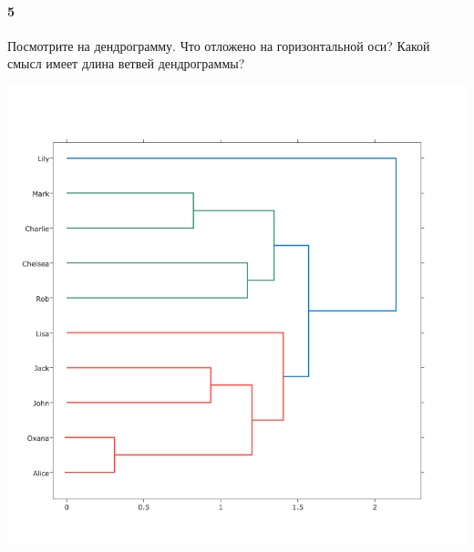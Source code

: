 \documentclass[a4paper,12pt]{article}
\begin{document}
  \paragraph{5} 
  \begin{minipage}{0.45\linewidth}
    Посмотрите на дендрограмму. Что отложено на горизонтальной оси? Какой смысл имеет длина ветвей дендрограммы? \\     
  \end{minipage}%
  \begin{minipage}{0.45\linewidth}
    \begin{center}
      \includegraphics[width=\linewidth]{images/newplot}\\
    \end{center}
  \end{minipage}\\
  \makebox[\linewidth]{\hrulefill}
  \makebox[\linewidth]{\hrulefill}
  \makebox[\linewidth]{\hrulefill}
\end{document}
